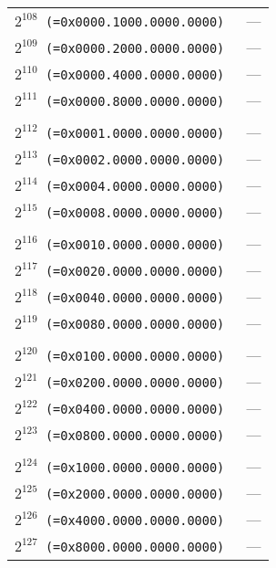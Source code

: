 \documentclass[documentation]{subfiles}
\begin{document}
\begin{small}
\begin{longtable}{>{\tt}rl}
        \\
        $2^{108}$ (=0x0000.1000.0000.0000) & ---\\
        $2^{109}$ (=0x0000.2000.0000.0000) & ---\\
        $2^{110}$ (=0x0000.4000.0000.0000) & ---\\
        $2^{111}$ (=0x0000.8000.0000.0000) & ---\\
        \\
        $2^{112}$ (=0x0001.0000.0000.0000) & ---\\
        $2^{113}$ (=0x0002.0000.0000.0000) & ---\\
        $2^{114}$ (=0x0004.0000.0000.0000) & ---\\
        $2^{115}$ (=0x0008.0000.0000.0000) & ---\\
        \\
        $2^{116}$ (=0x0010.0000.0000.0000) & ---\\
        $2^{117}$ (=0x0020.0000.0000.0000) & ---\\
        $2^{118}$ (=0x0040.0000.0000.0000) & ---\\
        $2^{119}$ (=0x0080.0000.0000.0000) & ---\\
        \\
        $2^{120}$ (=0x0100.0000.0000.0000) & ---\\
        $2^{121}$ (=0x0200.0000.0000.0000) & ---\\
        $2^{122}$ (=0x0400.0000.0000.0000) & ---\\
        $2^{123}$ (=0x0800.0000.0000.0000) & ---\\
        \\
        $2^{124}$ (=0x1000.0000.0000.0000) & ---\\
        $2^{125}$ (=0x2000.0000.0000.0000) & ---\\
        $2^{126}$ (=0x4000.0000.0000.0000) & ---\\
        $2^{127}$ (=0x8000.0000.0000.0000) & ---\\
        \bottomrule
    \end{longtable}
\end{small}
\end{document}
